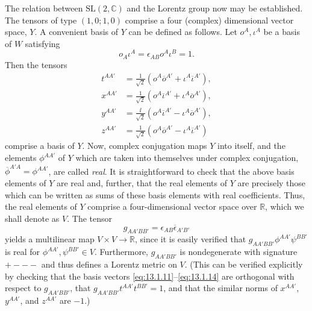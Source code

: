 The relation between \(\mathrm{SL}(2,\mathbb C)\) and the Lorentz group now may be
established. The tensors of type \((1,0;1,0)\) comprise a four (complex)
dimensional vector space, \(Y\). A convenient basis of \(Y\) can be defined as
follows. Let \(o^A,\iota^A\) be a basis of \(W\) satisfying
\begin{equation}
  o_A\iota^A=\epsilon_{AB}o^A\iota^B=1.
  \tag{13.1.10}\label{eq:13.1.10}
\end{equation}
Then the tensors
\begin{align}
  t^{AA'}&=\frac1{\sqrt2}\left(o^A\overline o^{A'}+
    \iota^A\overline\iota^{A'}\right),
  \tag{13.1.11}\label{eq:13.1.11}\\
  x^{AA'}&=\frac1{\sqrt2}\left(o^A\overline\iota^{A'}+
    \iota^A\overline o^{A'}\right),
  \tag{13.1.12}\label{eq:13.1.12}\\
  y^{AA'}&=\frac{\ii}{\sqrt2}\left(o^A\overline\iota^{A'}-
    \iota^A\overline o^{A'}\right),
  \tag{13.1.13}\label{eq:13.1.13}\\
  z^{AA'}&=\frac1{\sqrt2}\left(o^A\overline o^{A'}-
    \iota^A\overline\iota^{A'}\right)
  \tag{13.1.14}\label{eq:13.1.14}
\end{align}
comprise a basis of \(Y\). Now, complex conjugation maps \(Y\) into itself, and the
elements \(\phi^{AA'}\) of \(Y\) which are taken into themselves under complex
conjugation, \(\overline\phi^{A'A}=\phi^{AA'}\), are called \emph{real}. It is
straightforward to check that the above basis elements of \(Y\) are real and,
further, that the real elements of \(Y\) are precisely those which can be written as
sums of these basis elements with real coefficients. Thus, the real elements of \(Y\)
comprise a four-dimensional vector space over \(\mathbb R\), which we shall denote
as \(V\). The tensor
\begin{equation}
  g_{AA'BB'}=\epsilon_{AB}\overline\epsilon_{A'B'}
  \tag{13.1.15}\label{eq:13.1.15}
\end{equation}
yields a multilinear map \(V\times V\longrightarrow\mathbb R\), since it is easily
verified that \(g_{AA'BB'}\phi^{AA'}\psi^{BB'}\) is real for
\(\phi^{AA'},\psi^{BB'}\in V\). Furthermore, \(g_{AA'BB'}\) is nondegenerate with
signature \(+---\) and thus defines a Lorentz metric on \(V\). (This can be verified
explicitly by checking that the basis vectors
\eqref{eq:13.1.11}--\eqref{eq:13.1.14} are orthogonal with respect to
\(g_{AA'BB'}\), that \(g_{AA'BB'}t^{AA'}t^{BB'}=1\), and that the similar norms of
\(x^{AA'}\), \(y^{AA'}\), and \(z^{AA'}\) are \(-1\).)

